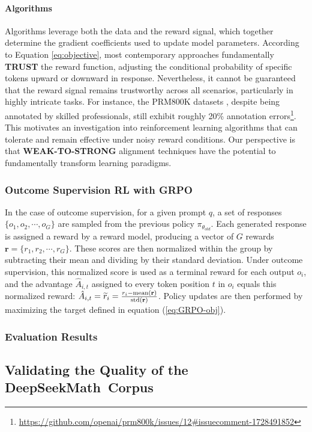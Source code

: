 \paragraph{Algorithms} Algorithms leverage both the data and the reward signal, which together determine the gradient coefficients used to update model parameters. According to Equation \ref{eq:objective}, most contemporary approaches fundamentally \textbf{TRUST} the reward function, adjusting the conditional probability of specific tokens upward or downward in response. Nevertheless, it cannot be guaranteed that the reward signal remains trustworthy across all scenarios, particularly in highly intricate tasks. For instance, the PRM800K datasets \citep{lightman2023let}, despite being annotated by skilled professionals, still exhibit roughly 20\% annotation errors\footnote{\url{https://github.com/openai/prm800k/issues/12\#issuecomment-1728491852}}. This motivates an investigation into reinforcement learning algorithms that can tolerate and remain effective under noisy reward conditions. Our perspective is that \textbf{WEAK-TO-STRONG} \citep{burns2023weak} alignment techniques have the potential to fundamentally transform learning paradigms.

\subsubsection{Outcome Supervision RL with GRPO} In the case of outcome supervision, for a given prompt $q$, a set of responses $\{o_1, o_2, \cdots, o_G\}$ are sampled from the previous policy $\pi_{\theta_{old}}$. Each generated response is assigned a reward by a reward model, producing a vector of $G$ rewards $\mathbf{r}=\{r_1, r_2, \cdots, r_G\}$. These scores are then normalized within the group by subtracting their mean and dividing by their standard deviation. Under outcome supervision, this normalized score is used as a terminal reward for each output $o_i$, and the advantage $\hat{A}_{i, t}$ assigned to every token position $t$ in $o_i$ equals this normalized reward: $\hat{A}_{i, t} = \widetilde{r}_i = \frac{r_i- {\rm mean}(\mathbf{r})}{{\rm std}(\mathbf{r})}$. Policy updates are then performed by maximizing the target defined in equation (\ref{eq:GRPO-obj}).

\subsubsection{Evaluation Results}

\subsection{Validating the Quality of the DeepSeekMath~Corpus}

